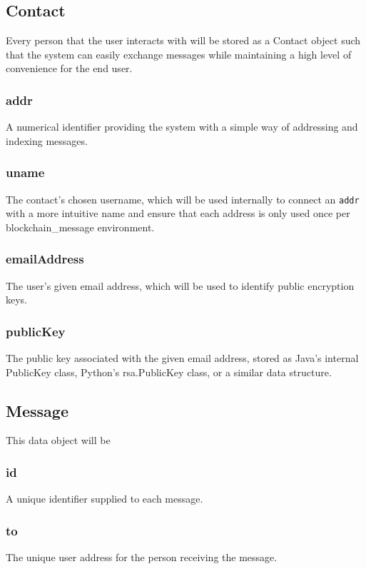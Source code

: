 \documentclass[titlepage]{report}
\begin{document}
\subsection{Contact}
Every person that the user interacts with will be stored as a Contact object such that the system can easily exchange messages while maintaining a high level of convenience for the end user.

\subsubsection{addr}
A numerical identifier providing the system with a simple way of addressing and indexing messages.

\subsubsection{uname}
The contact's chosen username, which will be used internally to connect an \texttt{addr} with a more intuitive name and ensure that each address is only used once per blockchain\_message environment.

\subsubsection{emailAddress}
The user's given email address, which will be used to identify public encryption keys.

\subsubsection{publicKey}
The public key associated with the given email address, stored as Java's internal PublicKey class, Python's rsa.PublicKey class, or a similar data structure.

\subsection{Message}
This data object will be 

\subsubsection{id}
A unique identifier supplied to each message.

\subsubsection{to}
The unique user address for the person receiving the message.
\end{document}
